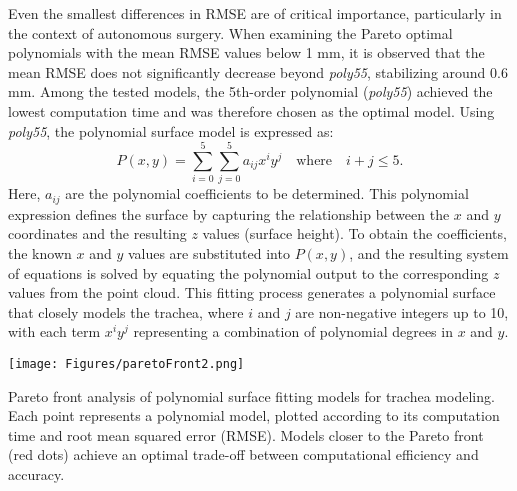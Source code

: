 Even the smallest differences in RMSE are of critical importance, particularly in the context of autonomous surgery. When examining the Pareto optimal polynomials with the mean RMSE values below 1 mm, it is observed that the mean RMSE does not significantly decrease beyond \textit{poly55}, stabilizing around 0.6 mm. Among the tested models, the 5th-order polynomial (\textit{poly55}) achieved the lowest computation time and was therefore chosen as the optimal model. Using \textit{poly55}, the polynomial surface model is expressed as:
\begin{equation}
    P(x, y) = \sum_{i=0}^{5} \sum_{j=0}^{5} a_{ij} x^i y^j \quad \text{where} \quad i + j \leq 5.
    \label{eq:5thOrder} \nonumber
\end{equation}
Here, $a_{ij}$ are the polynomial coefficients to be determined. This polynomial expression defines the surface by capturing the relationship between the $x$ and $y$ coordinates and the resulting $z$ values (surface height). To obtain the coefficients, the known $x$ and $y$ values are substituted into $P(x, y)$, and the resulting system of equations is solved by equating the polynomial output to the corresponding $z$ values from the point cloud. This fitting process generates a polynomial surface that closely models the trachea, where $i$ and $j$ are non-negative integers up to 10, with each term $x^i y^j$ representing a combination of polynomial degrees in $x$ and $y$.



\vspace{1em}

\begin{figurehere}
    \centering
    \texttt{[image: Figures/paretoFront2.png]}
    \caption{Pareto front analysis of polynomial surface fitting models for trachea modeling. Each point represents a polynomial model, plotted according to its computation time and root mean squared error (RMSE). Models closer to the Pareto front (red dots) achieve an optimal trade-off between computational efficiency and accuracy.}
    \label{fig:paretoFront}
\end{figurehere} 


                 




